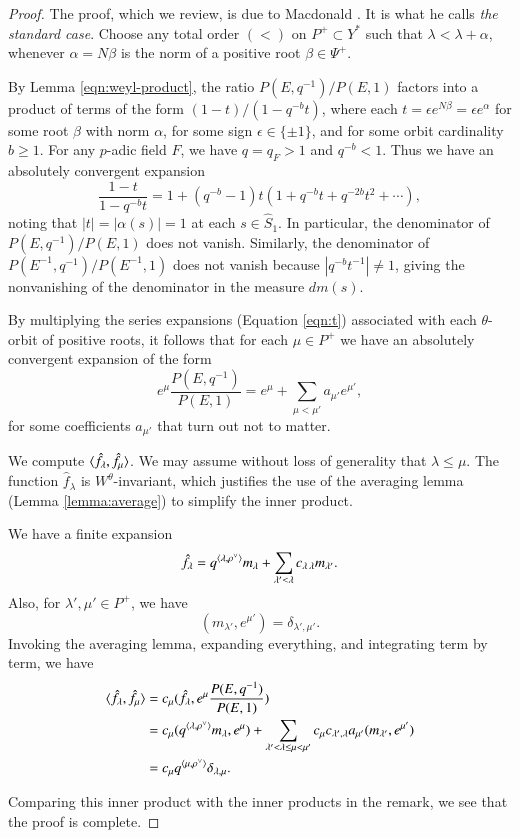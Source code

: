 \begin{proof}  
The proof, which we review, is due to Macdonald \cite[Ch.V]{macdonaldspherical}.
It is what he calls {\it the standard case}.  
Choose any total order $(<)$ on $P^+\subset Y^*$ such that 
$\lambda < \lambda + \alpha$, whenever $\alpha = N\beta$ is the norm of a positive root $\beta\in\Psi^+$.

By Lemma \ref{eqn:weyl-product},
the ratio $P(E,q^{-1})/P(E,1)$  factors into a product of terms of the form $(1- t)/(1- q^{-b} t)$, 
where each $t = \epsilon e^{N\beta} = \epsilon e^\alpha$ for
some root $\beta$ with norm $\alpha$, 
for some sign $\epsilon\in \{\pm 1\}$, and for some orbit cardinality $b\ge 1$.
For any $p$-adic field $F$, we have $q = q_F > 1$ and $q^{-b} < 1$.  Thus we have an absolutely convergent 
expansion
\begin{equation}\label{eqn:t}
\frac{1- t}{1- q^{-b} t} = 1 + (q^{-b}-1) t (1+ q^{-b} t + q^{-2b} t^2 + \cdots),
\end{equation}
noting that $|t| = |\alpha(s)|=1$ at each $s\in \hat S_1$.  In particular, the denominator of $P(E,q^{-1})/P(E,1)$ does not
vanish.  Similarly, the
denominator of $P(E^{-1},q^{-1})/P(E^{-1},1)$ does not vanish because $|q^{-b} t^{-1}|\ne1$, giving the nonvanishing of the
denominator in the measure $dm(s)$.

By multiplying the series expansions (Equation \ref{eqn:t}) associated with each $\theta$-orbit of positive roots,
it follows that for each $\mu\in P^+$ we have an absolutely convergent expansion of the form
\[
e^\mu \frac{P(E,q^{-1})}{P(E,1)} = e^\mu +\sum_{\mu< \mu'} a_{\mu'} e^{\mu'},
\] 
for some coefficients $a_{\mu'}$ that turn out not to matter.

We compute $\langle{\hat f_\lambda,\hat f_\mu}\rangle$.
We may assume without loss of generality that $\lambda \le \mu$.
The function $\hat f_\lambda$ is $W^\theta$-invariant, which justifies the use of 
the averaging lemma (Lemma \ref{lemma:average}) to simplify the inner product.

We have a finite expansion
\[
\hat f_\lambda = q^{\langle{\lambda,\rho^\vee}\rangle} m_\lambda + \sum_{\lambda' <\lambda } c_{\lambda\,\lambda} m_{\lambda'}.
\]
Also, for $\lambda',\mu'\in P^+$, we have
\[
(m_{\lambda'},e^{\mu'}) = \delta_{\lambda',{\mu'}}.
\]
Invoking the averaging lemma, expanding everything, and integrating term by term, we have
\begin{align*}
\langle{\hat f_\lambda,\hat f_\mu}\rangle &= c_\mu (\hat f_\lambda, e^\mu \frac{ P(E,q^{-1})}{P(E,1)})\\
&= c_\mu (q^{\langle{\lambda,\rho^\vee}\rangle} m_\lambda,e^\mu) + \sum_{\lambda' < \lambda\le\mu < \mu'}
c_\mu c_{\lambda',\lambda} a_{\mu'} (m_{\lambda'},e^{\mu'})\\ 
&= c_\mu q^{\langle{\mu,\rho^\vee}\rangle} \delta_{\lambda,\mu}.
\end{align*}

Comparing this inner product with the  inner products in the remark, we see that the proof is 
complete.
\end{proof}



